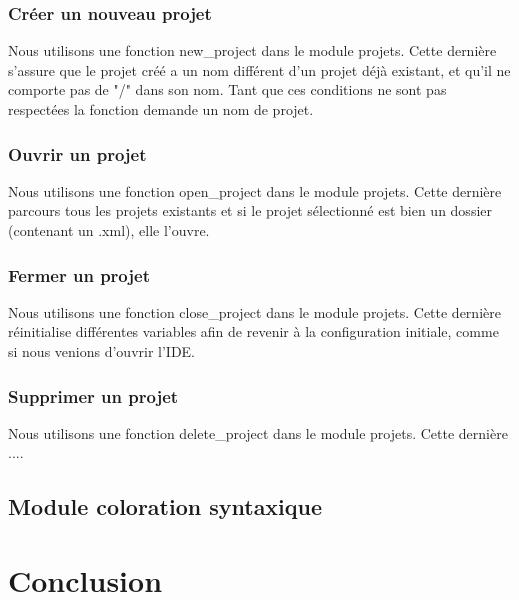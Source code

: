 \documentclass[a4paper,12pt]{article}
\begin{document}
			\subsubsection*{Créer un nouveau projet}
			Nous utilisons une fonction new\_project dans le module projets. Cette dernière s'assure que le projet créé a un nom différent d'un projet déjà existant, et qu'il ne comporte pas de "/" dans son nom. \newpage Tant que ces conditions ne sont pas respectées la fonction demande un nom de projet.\\
			
			\subsubsection*{Ouvrir un projet}
			Nous utilisons une fonction open\_project dans le module projets. Cette dernière parcours tous les projets existants et si le projet sélectionné est bien un dossier (contenant un .xml), elle l'ouvre.\\
			
			\subsubsection*{Fermer un projet}
			Nous utilisons une fonction close\_project dans le module projets. Cette dernière réinitialise différentes variables afin de revenir à la configuration initiale, comme si nous venions d'ouvrir l'IDE.\\
			
			\subsubsection*{Supprimer un projet}
			Nous utilisons une fonction delete\_project dans le module projets. Cette dernière ....\\
			
		\subsection{Module coloration syntaxique}	
	
\section{Conclusion}
	
\end{document}

